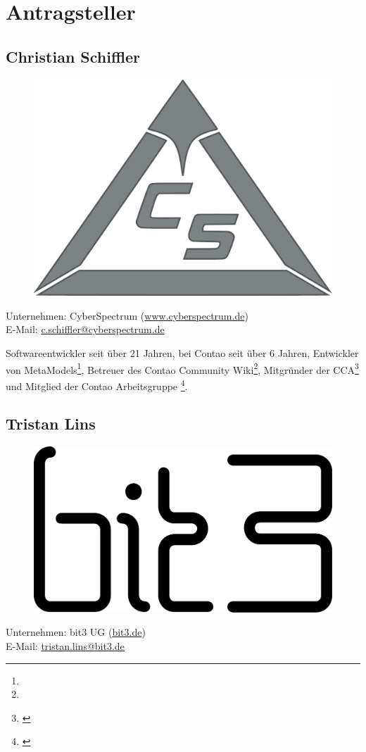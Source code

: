\documentclass[
paper=a4,
draft=false,%
fontsize=10pt%
]{scrartcl}
\begin{document}
\section{Antragsteller}
\label{sec:proposer}

\subsection*{Christian  Schiffler}

\begin{figure}
  \vspace{-50pt}
  \hfill
  \includegraphics[width=.2\textwidth]{bilder/cyberspectrum}
\end{figure}

Unternehmen: CyberSpectrum (\href{https://www.cyberspectrum.de}{www.cyberspectrum.de}) \\
E-Mail: \href{mailto:c.schiffler@cyberspectrum.de}{c.schiffler@cyberspectrum.de}

Softwareentwickler seit über 21 Jahren, bei Contao seit über 6 Jahren, Entwickler von MetaModels\footnote{}, Betreuer des Contao Community Wiki\footnote{}, Mitgründer der CCA\footnote{\label{fn:cca}} und Mitglied der Contao Arbeitsgruppe \footnote{\label{fn:contao-workgroup-core}}.

\subsection*{Tristan  Lins}

\begin{figure}
  \vspace{-40pt}
  \hfill
  \includegraphics[width=.2\textwidth]{bilder/bit3}
\end{figure}

Unternehmen: bit3 UG (\href{https://bit3.de}{bit3.de}) \\
E-Mail: \href{mailto:tristan.lins@bit3.de}{tristan.lins@bit3.de}
\end{document}
